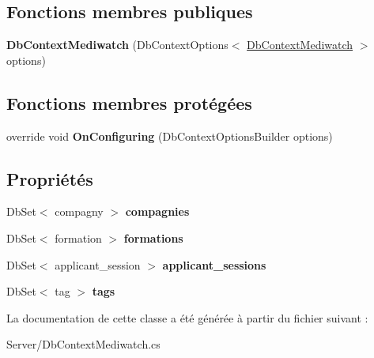 \subsection*{Fonctions membres publiques}
\begin{DoxyCompactItemize}
\item 
\mbox{\label{class_server_1_1_db_context_mediwatch_a94fde86883fe0a2d1ce0b4c58f06727f}} 
{\bfseries Db\+Context\+Mediwatch} (Db\+Context\+Options$<$ \hyperlink{class_server_1_1_db_context_mediwatch}{Db\+Context\+Mediwatch} $>$ options)
\end{DoxyCompactItemize}
\subsection*{Fonctions membres protégées}
\begin{DoxyCompactItemize}
\item 
\mbox{\label{class_server_1_1_db_context_mediwatch_a72073ff88f3990c4792f85688f55f073}} 
override void {\bfseries On\+Configuring} (Db\+Context\+Options\+Builder options)
\end{DoxyCompactItemize}
\subsection*{Propriétés}
\begin{DoxyCompactItemize}
\item 
\mbox{\label{class_server_1_1_db_context_mediwatch_a068d9222b8448c069c2d181a9f577d0c}} 
Db\+Set$<$ compagny $>$ {\bfseries compagnies}
\item 
\mbox{\label{class_server_1_1_db_context_mediwatch_a6597dab2848cd5aa87774af4bf6eb4e4}} 
Db\+Set$<$ formation $>$ {\bfseries formations}
\item 
\mbox{\label{class_server_1_1_db_context_mediwatch_aea8aaf9d1c1f27f64a2a488f41c531b2}} 
Db\+Set$<$ applicant\+\_\+session $>$ {\bfseries applicant\+\_\+sessions}
\item 
\mbox{\label{class_server_1_1_db_context_mediwatch_a0bcaba8827c3d82857deb35923f6dcef}} 
Db\+Set$<$ tag $>$ {\bfseries tags}
\end{DoxyCompactItemize}


La documentation de cette classe a été générée à partir du fichier suivant \+:\begin{DoxyCompactItemize}
\item 
Server/Db\+Context\+Mediwatch.\+cs\end{DoxyCompactItemize}
